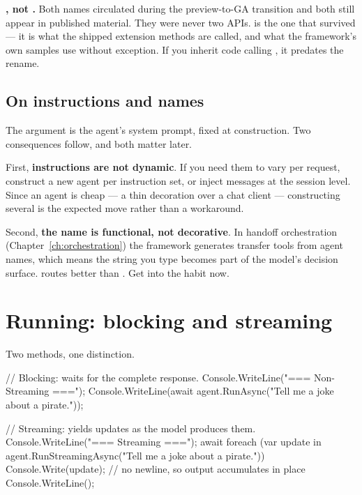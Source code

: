\begin{note}
\textbf{, not .} Both names circulated during
the preview-to-GA transition and both still appear in published material. They
were never two APIs.  is the one that survived --- it is what the
shipped extension methods are called, and what the framework's own samples use
without exception. If you inherit code calling , it predates
the rename.
\end{note}

\subsection{On instructions and names}

The  argument is the agent's system prompt, fixed at
construction. Two consequences follow, and both matter later.

First, \textbf{instructions are not dynamic}. If you need them to vary per
request, construct a new agent per instruction set, or inject messages at the
session level. Since an agent is cheap --- a thin decoration over a chat client
--- constructing several is the expected move rather than a workaround.

Second, \textbf{the name is functional, not decorative}. In handoff orchestration
(Chapter~\ref{ch:orchestration}) the framework generates transfer tools from
agent names, which means the string you type becomes part of the model's decision
surface.  routes better than . Get into the habit now.

\section{Running: blocking and streaming}
\label{sec:running}

Two methods, one distinction.

\begin{csharp}[caption={Both response modes}, label={lst:streaming}]
// Blocking: waits for the complete response.
Console.WriteLine("=== Non-Streaming ===");
Console.WriteLine(await agent.RunAsync("Tell me a joke about a pirate."));

// Streaming: yields updates as the model produces them.
Console.WriteLine("=== Streaming ===");
await foreach (var update in agent.RunStreamingAsync("Tell me a joke about a pirate."))
{
    Console.Write(update);   // no newline, so output accumulates in place
}
Console.WriteLine();
\end{csharp}

